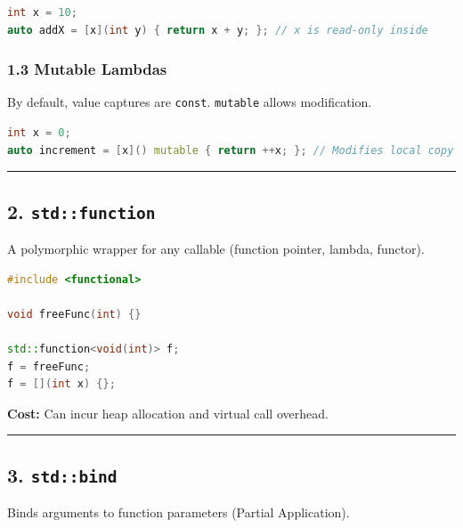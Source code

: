 \begin{lstlisting}[language={C++}]
int x = 10;
auto addX = [x](int y) { return x + y; }; // x is read-only inside
\end{lstlisting}

\hypertarget{mutable-lambdas}{%
\subsubsection{1.3 Mutable Lambdas}\label{mutable-lambdas}}

By default, value captures are \passthrough{\lstinline!const!}.
\passthrough{\lstinline!mutable!} allows modification.

\begin{lstlisting}[language={C++}]
int x = 0;
auto increment = [x]() mutable { return ++x; }; // Modifies local copy
\end{lstlisting}

\begin{center}\rule{0.5\linewidth}{0.5pt}\end{center}

\hypertarget{stdfunction}{%
\subsection{\texorpdfstring{2.
\texttt{std::function}}{2. std::function}}\label{stdfunction}}

A polymorphic wrapper for any callable (function pointer, lambda,
functor).

\begin{lstlisting}[language={C++}]
#include <functional>

void freeFunc(int) {}

std::function<void(int)> f;
f = freeFunc;
f = [](int x) {};
\end{lstlisting}

\textbf{Cost:} Can incur heap allocation and virtual call overhead.

\begin{center}\rule{0.5\linewidth}{0.5pt}\end{center}

\hypertarget{stdbind}{%
\subsection{\texorpdfstring{3.
\texttt{std::bind}}{3. std::bind}}\label{stdbind}}

Binds arguments to function parameters (Partial Application).

